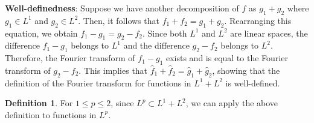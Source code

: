 \documentclass[12pt,openany]{book}
\theoremstyle{definition}
\newtheorem{definition}[theorem]{Definition}
\begin{document}
\textbf{Well-definedness}: Suppose we have another decomposition of $f$ as $g_1 + g_2$ where $g_1 \in L^1$ and $g_2 \in L^2$. Then, it follows that $f_1 + f_2 = g_1 + g_2$. Rearranging this equation, we obtain $f_1 - g_1 = g_2 - f_2$. Since both $L^1$ and $L^2$ are linear spaces, the difference $f_1 - g_1$ belongs to $L^1$ and the difference $g_2 - f_2$ belongs to $L^2$. Therefore, the Fourier transform of $f_1 - g_1$ exists and is equal to the Fourier transform of $g_2 - f_2$. This implies that $\hat{f}_1 + \hat{f}_2 = \hat{g}_1 + \hat{g}_2$, showing that the definition of the Fourier transform for functions in $L^1 + L^2$ is well-defined.

\begin{definition}
    For $1 \leq p \leq 2$, since $L^p \subset L^1 + L^2$, we can apply the above definition to functions in $L^p$.
\end{definition}
\end{document}
